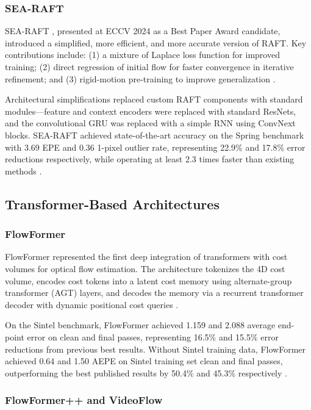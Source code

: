 \subsubsection{SEA-RAFT}

SEA-RAFT \cite{wang2024searaft}, presented at ECCV 2024 as a Best Paper Award candidate, introduced a simplified, more efficient, and more accurate version of RAFT. Key contributions include: (1) a mixture of Laplace loss function for improved training; (2) direct regression of initial flow for faster convergence in iterative refinement; and (3) rigid-motion pre-training to improve generalization \cite{wang2024searaft}.

Architectural simplifications replaced custom RAFT components with standard modules---feature and context encoders were replaced with standard ResNets, and the convolutional GRU was replaced with a simple RNN using ConvNext blocks. SEA-RAFT achieved state-of-the-art accuracy on the Spring benchmark with 3.69 EPE and 0.36 1-pixel outlier rate, representing 22.9\% and 17.8\% error reductions respectively, while operating at least 2.3 times faster than existing methods \cite{wang2024searaft}.

\subsection{Transformer-Based Architectures}

\subsubsection{FlowFormer}

FlowFormer \cite{huang2022flowformer} represented the first deep integration of transformers with cost volumes for optical flow estimation. The architecture tokenizes the 4D cost volume, encodes cost tokens into a latent cost memory using alternate-group transformer (AGT) layers, and decodes the memory via a recurrent transformer decoder with dynamic positional cost queries \cite{huang2022flowformer}.

On the Sintel benchmark, FlowFormer achieved 1.159 and 2.088 average end-point error on clean and final passes, representing 16.5\% and 15.5\% error reductions from previous best results. Without Sintel training data, FlowFormer achieved 0.64 and 1.50 AEPE on Sintel training set clean and final passes, outperforming the best published results by 50.4\% and 45.3\% respectively \cite{huang2022flowformer}.

\subsubsection{FlowFormer++ and VideoFlow}

